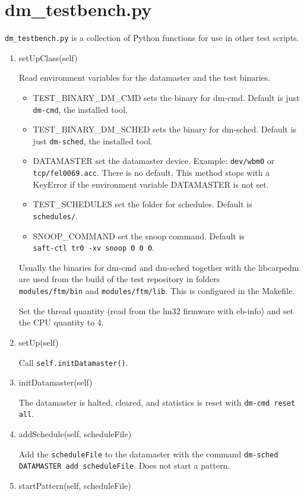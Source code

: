 \documentclass[12pt,a4paper]{report}
\begin{document}
\section{dm\_testbench.py}
\texttt{dm\_testbench.py} is a collection of Python functions for use
in other test scripts.
\begin{enumerate}
\item setUpClass(self)

Read environment variables for the datamaster and the test binaries.
\begin{itemize}
\item TEST\_BINARY\_DM\_CMD sets the binary for dm-cmd. Default is just
\texttt{dm-cmd}, the installed tool.
\item TEST\_BINARY\_DM\_SCHED sets the binary for dm-sched. Default is just
\texttt{dm-sched}, the installed tool.
\item DATAMASTER set the datamaster device. Example: \texttt{dev/wbm0} or
\texttt{tcp/fel0069.acc}. There is no default. This method stops with a
KeyError if the environment variable DATAMASTER is not set.
\item TEST\_SCHEDULES set the folder for schedules. Default is \\
 \texttt{schedules/}.
\item SNOOP\_COMMAND set the snoop command. Default is \\
\texttt{saft-ctl tr0 -xv snoop 0 0 0}.
\end{itemize}
Usually the binaries for dm-cmd and dm-sched together with the libcarpedm
are used from the build of the test repository in folders \\
\texttt{modules/ftm/bin} and \texttt{modules/ftm/lib}. This is
configured in the Makefile.

Set the thread quantity (read from the lm32 firmware with eb-info) and
set the CPU quantity to 4.

\item setUp(self)

Call \texttt{self.initDatamaster()}.
\item initDatamaster(self)

The datamaster is halted, cleared, and statistics is reset with
\texttt{dm-cmd reset all}.
\item addSchedule(self, scheduleFile)

Add the \texttt{scheduleFile} to the datamaster with the command
\texttt{dm-sched DATAMASTER add scheduleFile}. Does not start a pattern.
\item startPattern(self, scheduleFile)


\end{enumerate}
\end{document}

